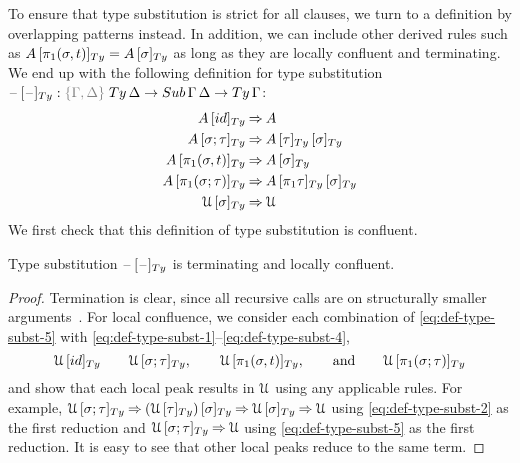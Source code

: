 \documentclass[a4paper,UKenglish,numberwithinsect,cleveref,thm-restate]{lipics-v2021}
\newcommand{\danger}{\marginpar[\hfill\dbend]{\dbend\hfill}}
\begin{document}
To ensure that type substitution is strict for all clauses,
we turn to a definition by overlapping patterns %
instead. %
In addition, we can include other derived rules such as $\subTy{A}{\pi_1(\sigma, t)} = \subTy{A}{\sigma}$ as long as they are locally confluent and terminating.
We end up with the following definition for type substitution $\subTy{\blank}{\blank} : \implicit{\Gamma, \Delta} \; \Ty\,\Delta \to \Sub\,\Gamma\,\Delta \to \Ty\,\Gamma$:
\begin{alignat}{3}
\subTy{A}{\idS}                & \reduce A \label{eq:def-type-subst-1}\\
\subTy{A}{\sigma ; \tau}       & \reduce \subTy{\subTy{A}{\tau}}{\sigma} \label{eq:def-type-subst-2}\\
\subTy{A}{\pi_1(\sigma, t)}    & \reduce \subTy{A}{\sigma} \label{eq:def-type-subst-3} \\
\subTy{A}{\pi_1(\sigma; \tau)} & \reduce \subTy{\subTy{A}{\pi_1\tau}}{\sigma} \label{eq:def-type-subst-4} \\
\subTy{\UU}{\sigma}            & \reduce \UU                                   \label{eq:def-type-subst-5}
\end{alignat}
We first check that this definition of type substitution is confluent.
%
\begin{proposition}\label{prop:local-confluence-1}
  Type substitution $\subTy{\blank}{\blank}$ is terminating and locally confluent.
  \danger
\end{proposition}
\begin{proof}
  Termination is clear, since all recursive calls are on structurally smaller arguments~\cite{Abel2002}.
  For local confluence, we consider each combination of \eqref{eq:def-type-subst-5} with \eqref{eq:def-type-subst-1}--\eqref{eq:def-type-subst-4},
  \[
    \subTy{\UU}{\idS} \qquad \subTy{\UU}{\sigma;\tau}, \qquad \subTy{\UU}{\pi_1(\sigma, t)}, \qquad\text{and}\qquad \subTy{\UU}{\pi_1(\sigma; \tau)}
  \]
  and show that each local peak results in $\mathcal{U}$ using any applicable rules.
  For example, $\subTy{\UU}{\sigma;\tau} \reduce \subTy{(\subTy{\UU}{\tau})}{\sigma} \reduce \subTy{\UU}{\sigma} \reduce \UU$ using \eqref{eq:def-type-subst-2} as the first reduction and $\subTy{\UU}{\sigma;\tau} \reduce \UU$ using \eqref{eq:def-type-subst-5} as the first reduction.
  It is easy to see that other local peaks reduce to the same term.
\end{proof}
\end{document}
